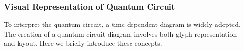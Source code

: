 

\subsubsection{Visual Representation of Quantum Circuit}
To interpret the quantum circuit, a time-dependent diagram is widely adopted.
The creation of a quantum circuit diagram involves both glyph representation and layout.
Here we briefly introduce these concepts.

